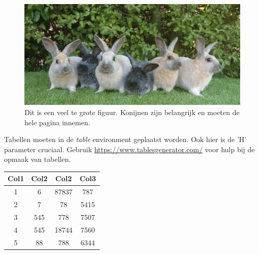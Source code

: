\begin{figure}[!htpb]
    \centering
    \includegraphics{Figures/Enderby_Island_Rabbit_Lineup.jpg}
    \caption{Dit is een veel te grote figuur. Konijnen zijn belangrijk en moeten de hele pagina innemen.}
    \label{fig:konijnen}
\end{figure}

Tabellen moeten in de \textit{table} environment geplaatst worden.
Ook hier is de 'H' parameter cruciaal.
Gebruik \url{https://www.tablesgenerator.com/} voor hulp bij de opmaak van tabellen.
\begin{table}[H]
\centering
 \begin{tabular}{||c c c c||} 
 \hline
 Col1 & Col2 & Col2 & Col3 \\ [0.5ex] 
 \hline\hline
 1 & 6 & 87837 & 787 \\ 
 2 & 7 & 78 & 5415 \\
 3 & 545 & 778 & 7507 \\
 4 & 545 & 18744 & 7560 \\
 5 & 88 & 788 & 6344 \\ [1ex] 
 \hline
 \end{tabular}
\end{table}